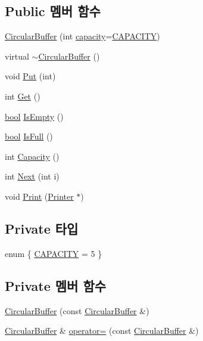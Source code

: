 \subsection*{Public 멤버 함수}
\begin{DoxyCompactItemize}
\item 
\hyperlink{class_circular_buffer_af323cbeb1109dde6044a4da8517295e5}{Circular\+Buffer} (int \hyperlink{class_circular_buffer_adbe66a087ac3fd4a5b0566f64ca2d12b}{capacity}=\hyperlink{class_circular_buffer_a39b4e25c4e8f5fed29720be17a532fa8ab7dda006facfb86f75aa6e0210a77448}{C\+A\+P\+A\+C\+I\+TY})
\item 
virtual \hyperlink{class_circular_buffer_ae529cdac341d8d1ed0cc361fc6dd594d}{$\sim$\+Circular\+Buffer} ()
\item 
void \hyperlink{class_circular_buffer_acb614e0e762b045fef30b8a65d53b9d2}{Put} (int)
\item 
int \hyperlink{class_circular_buffer_a6f81c8f05fd6884b9fbbaab400152e5c}{Get} ()
\item 
\hyperlink{avb__gptp_8h_af6a258d8f3ee5206d682d799316314b1}{bool} \hyperlink{class_circular_buffer_a357657ded604ecb97b76251146f7ac75}{Is\+Empty} ()
\item 
\hyperlink{avb__gptp_8h_af6a258d8f3ee5206d682d799316314b1}{bool} \hyperlink{class_circular_buffer_a1c83d39fdb01a97afc8bb10ee1879ea3}{Is\+Full} ()
\item 
int \hyperlink{class_circular_buffer_a1d6db7bdf7da56cb3e4bcb16ac4c1e71}{Capacity} ()
\item 
int \hyperlink{class_circular_buffer_abe22b9abf6ac9ebb941acdcea9f5abbe}{Next} (int i)
\item 
void \hyperlink{class_circular_buffer_a79915bb6ec9a5decf43547e4591ba04c}{Print} (\hyperlink{class_printer}{Printer} $\ast$)
\end{DoxyCompactItemize}
\subsection*{Private 타입}
\begin{DoxyCompactItemize}
\item 
enum \{ \hyperlink{class_circular_buffer_a39b4e25c4e8f5fed29720be17a532fa8ab7dda006facfb86f75aa6e0210a77448}{C\+A\+P\+A\+C\+I\+TY} = 5
 \}
\end{DoxyCompactItemize}
\subsection*{Private 멤버 함수}
\begin{DoxyCompactItemize}
\item 
\hyperlink{class_circular_buffer_ae8f41c44329ae1d99ce2cede55c7cd38}{Circular\+Buffer} (const \hyperlink{class_circular_buffer}{Circular\+Buffer} \&)
\item 
\hyperlink{class_circular_buffer}{Circular\+Buffer} \& \hyperlink{class_circular_buffer_aa6c7012c9a4c76e542377315a9c9010b}{operator=} (const \hyperlink{class_circular_buffer}{Circular\+Buffer} \&)
\end{DoxyCompactItemize}
